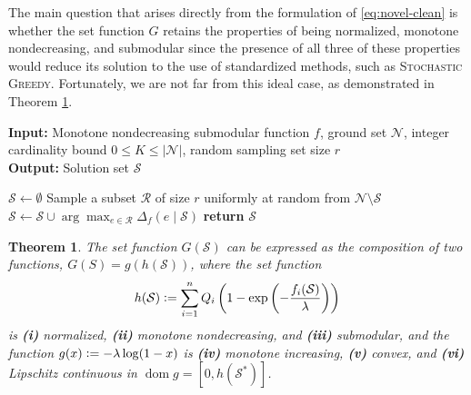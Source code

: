 \documentclass[letter,11pt]{article}
\newtheorem{theorem}{Theorem}[]
\newcommand{\argmax}{\arg\!\max}
\def\lp{\left(}
\def\rp{\right)}
\def\sS{\mathcal{S}}
\def\sN{\mathcal{N}}
\begin{document}
The main question that arises directly from the formulation of \eqref{eq:novel-clean} is whether the set function $G$ retains the properties of being normalized, monotone nondecreasing, and submodular since the presence of all three of these properties would reduce its solution to the use of standardized methods, such as \textsc{Stochastic Greedy}. Fortunately, we are not far from this ideal case, as demonstrated in Theorem \ref{prop:main}.
\begin{algorithm}[t]
\caption{\textsc{Stochastic Greedy}}
\label{alg:stoch-greedy}
\hspace*{\algorithmicindent}\textbf{Input:} Monotone nondecreasing submodular function $f$, ground set $\sN$, integer cardinality bound $ 0 \le K \le \lvert \sN \rvert$, random sampling set size $r$ \\
\hspace*{\algorithmicindent}\textbf{Output:} Solution set $\sS$
\begin{algorithmic}[1]
\STATE $\sS \leftarrow \emptyset$
\WHILE{$|\sS| < K$}
\STATE Sample a subset $\mathcal{R}$ of size $r$ uniformly at random from $\sN \setminus \sS$
\STATE $\sS \leftarrow \sS \cup \argmax_{e \in \mathcal{R}} \Delta_f(e\mid\sS)$
\ENDWHILE
\STATE \textbf{return} $\sS$
\end{algorithmic}
\end{algorithm}
\begin{theorem}\label{prop:main}
The set function $G(\sS)$ can be expressed as the composition of two functions, $G(S) = g(h(\sS))$, where the set function
\begin{equation}
h(\sS) \vcentcolon= \sum_{i=1}^n Q_i \lp1-\exp\lp-\frac{f_i(\sS)}{\lambda}\rp\rp
\end{equation}
is \textbf{(i)} normalized, \textbf{(ii)} monotone nondecreasing, and \textbf{(iii)} submodular, and the function $g(x) \vcentcolon= -\lambda\log(1-x)$ is \textbf{(iv)} monotone increasing, \textbf{(v)} convex, and \textbf{(vi)} Lipschitz continuous in $\operatorname{dom}g = [0, h(\sS^\ast)]$.
\end{theorem}
\end{document}
